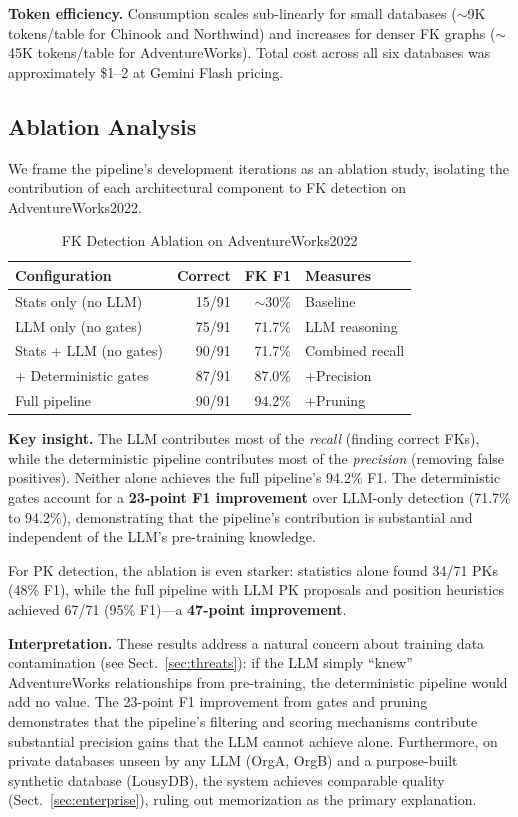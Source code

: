 \documentclass[twocolumn]{svjour3}
\begin{document}
\textbf{Token efficiency.} Consumption scales sub-linearly for small databases ($\sim$9K tokens/table for Chinook and Northwind) and increases for denser FK graphs ($\sim$45K tokens/table for AdventureWorks). Total cost across all six databases was approximately \$1--2 at Gemini Flash pricing.

\subsection{Ablation Analysis}\label{sec:ablation}

We frame the pipeline's development iterations as an ablation study, isolating the contribution of each architectural component to FK detection on AdventureWorks2022.

\begin{table}[htbp]
\caption{FK Detection Ablation on AdventureWorks2022}
\label{tab:ablation}
\centering
\begin{tabular}{lrrl}
\toprule
\textbf{Configuration} & \textbf{Correct} & \textbf{FK F1} & \textbf{Measures} \\
\midrule
Stats only (no LLM) & 15/91 & $\sim$30\% & Baseline \\
LLM only (no gates) & 75/91 & 71.7\% & LLM reasoning \\
Stats + LLM (no gates) & 90/91 & 71.7\% & Combined recall \\
+ Deterministic gates & 87/91 & 87.0\% & +Precision \\
Full pipeline & 90/91 & 94.2\% & +Pruning \\
\bottomrule
\end{tabular}
\end{table}

\textbf{Key insight.} The LLM contributes most of the \emph{recall} (finding correct FKs), while the deterministic pipeline contributes most of the \emph{precision} (removing false positives). Neither alone achieves the full pipeline's 94.2\% F1. The deterministic gates account for a \textbf{23-point F1 improvement} over LLM-only detection (71.7\% to 94.2\%), demonstrating that the pipeline's contribution is substantial and independent of the LLM's pre-training knowledge.

For PK detection, the ablation is even starker: statistics alone found 34/71 PKs (48\% F1), while the full pipeline with LLM PK proposals and position heuristics achieved 67/71 (95\% F1)---a \textbf{47-point improvement}.

\textbf{Interpretation.} These results address a natural concern about training data contamination (see Sect.~\ref{sec:threats}): if the LLM simply ``knew'' AdventureWorks relationships from pre-training, the deterministic pipeline would add no value. The 23-point F1 improvement from gates and pruning demonstrates that the pipeline's filtering and scoring mechanisms contribute substantial precision gains that the LLM cannot achieve alone. Furthermore, on private databases unseen by any LLM (OrgA, OrgB) and a purpose-built synthetic database (LousyDB), the system achieves comparable quality (Sect.~\ref{sec:enterprise}), ruling out memorization as the primary explanation.
\end{document}
